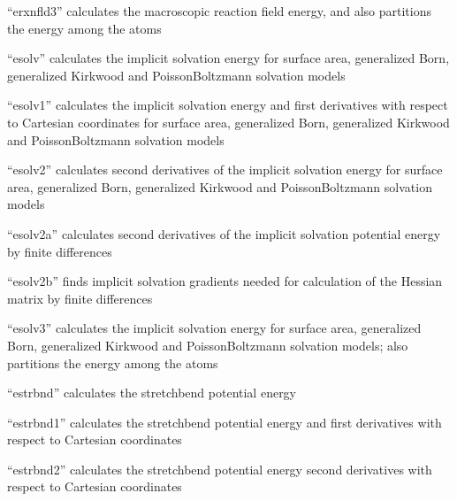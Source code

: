 \documentclass[letterpaper,11pt,english]{sphinxmanual}
\begin{document}

“erxnfld3” calculates the macroscopic reaction field energy,
and also partitions the energy among the atoms


“esolv” calculates the implicit solvation energy for surface area,
generalized Born, generalized Kirkwood and Poisson\sphinxhyphen{}Boltzmann
solvation models


“esolv1” calculates the implicit solvation energy and
first derivatives with respect to Cartesian coordinates
for surface area, generalized Born, generalized Kirkwood
and Poisson\sphinxhyphen{}Boltzmann solvation models


“esolv2” calculates second derivatives of the implicit
solvation energy for surface area, generalized Born,
generalized Kirkwood and Poisson\sphinxhyphen{}Boltzmann solvation models


“esolv2a” calculates second derivatives of the implicit solvation
potential energy by finite differences


“esolv2b” finds implicit solvation gradients needed for
calculation of the Hessian matrix by finite differences


“esolv3” calculates the implicit solvation energy for
surface area, generalized Born, generalized Kirkwood
and Poisson\sphinxhyphen{}Boltzmann solvation models; also partitions
the energy among the atoms


“estrbnd” calculates the stretch\sphinxhyphen{}bend potential energy


“estrbnd1” calculates the stretch\sphinxhyphen{}bend potential energy and
first derivatives with respect to Cartesian coordinates


“estrbnd2” calculates the stretch\sphinxhyphen{}bend potential energy
second derivatives with respect to Cartesian coordinates
\end{document}
